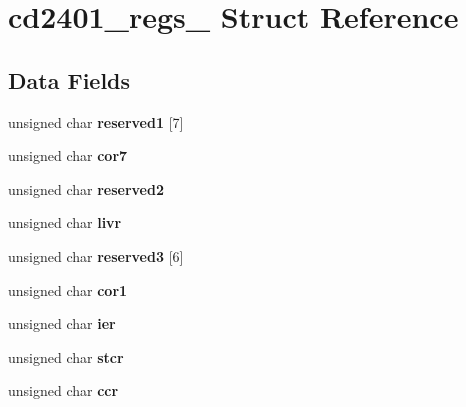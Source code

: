 \hypertarget{structcd2401__regs__}{}\section{cd2401\+\_\+regs\+\_\+ Struct Reference}
\label{structcd2401__regs__}
\subsection*{Data Fields}
\begin{DoxyCompactItemize}
\item 
\mbox{\label{structcd2401__regs___af4bcb646cef4497f5b7f882dbbf7aa74}} 
unsigned char {\bfseries reserved1} \mbox{[}7\mbox{]}
\item 
\mbox{\label{structcd2401__regs___a28d489d2601161da79d9fa0c0f045dfd}} 
unsigned char {\bfseries cor7}
\item 
\mbox{\label{structcd2401__regs___ac479513b72c29282b90e58d1f20b75ff}} 
unsigned char {\bfseries reserved2}
\item 
\mbox{\label{structcd2401__regs___a1ed2f59814ce9da879c10200ee55e889}} 
unsigned char {\bfseries livr}
\item 
\mbox{\label{structcd2401__regs___a617a5fbee3adf095022e3b9761a377b1}} 
unsigned char {\bfseries reserved3} \mbox{[}6\mbox{]}
\item 
\mbox{\label{structcd2401__regs___a4fb3a4574de39aabc3c91060093a7f64}} 
unsigned char {\bfseries cor1}
\item 
\mbox{\label{structcd2401__regs___a7e4f5a313098ef066b6ea35689b1c9bb}} 
unsigned char {\bfseries ier}
\item 
\mbox{\label{structcd2401__regs___af522f90e9b35be4ba7db4331343690ea}} 
unsigned char {\bfseries stcr}
\item 
\mbox{\label{structcd2401__regs___a2939dfba0d1c03da325a357ebd526167}} 
unsigned char {\bfseries ccr}
\item 

\end{DoxyCompactItemize}
